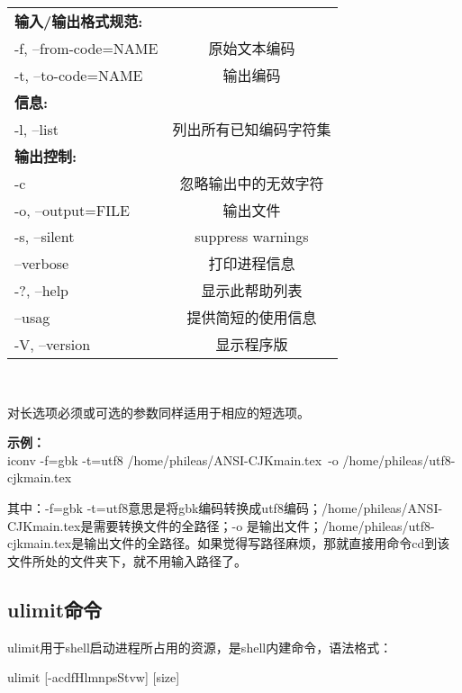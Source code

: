 \begin{center}
\begin{tabular}{lc}
\hline
 \bf{输入/输出格式规范:}           &         \\
 -f, --from-code=NAME     &    原始文本编码\\
 -t, --to-code=NAME           &    输出编码  \\
\hline
\bf{信息:}                                &         \\
 -l, --list                                      &    列出所有已知编码字符集\\
\hline
\bf{输出控制:}                      &     \\
 -c                                                 &忽略输出中的无效字符\\
 -o, --output=FILE                & 输出文件\\
 -s, --silent                                & suppress warnings\\
     --verbose                            & 打印进程信息\\
 -?, --help                                  & 显示此帮助列表\\
     --usag                                   &提供简短的使用信息\\
 -V, --version                          &显示程序版\\
\end{tabular}\\
\end{center}
对长选项必须或可选的参数同样适用于相应的短选项。

\textbf{示例：}\\
iconv -f=gbk -t=utf8 /home/phileas/ANSI-CJKmain.tex~-o /home/phileas/utf8-cjkmain.tex

其中：-f=gbk -t=utf8意思是将gbk编码转换成utf8编码；/home/phileas/ANSI-CJKmain.tex是需要转换文件的全路径；-o 是输出文件；/home/phileas/utf8-cjkmain.tex是输出文件的全路径。如果觉得写路径麻烦，那就直接用命令cd到该文件所处的文件夹下，就不用输入路径了。


\subsection{ulimit命令}
ulimit用于shell启动进程所占用的资源，是shell内建命令，语法格式：

ulimit [-acdfHlmnpsStvw] [size]

